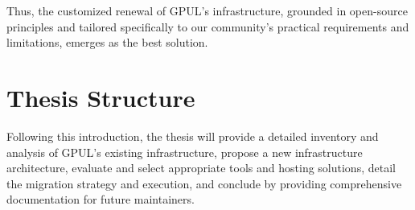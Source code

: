Thus, the customized renewal of GPUL's infrastructure, grounded in open-source principles and tailored specifically to our community's practical requirements and limitations, emerges as the best solution.

\section{Thesis Structure}

Following this introduction, the thesis will provide a detailed inventory and analysis of GPUL's existing infrastructure, propose a new infrastructure architecture, evaluate and select appropriate tools and hosting solutions, detail the migration strategy and execution, and conclude by providing comprehensive documentation for future maintainers.
